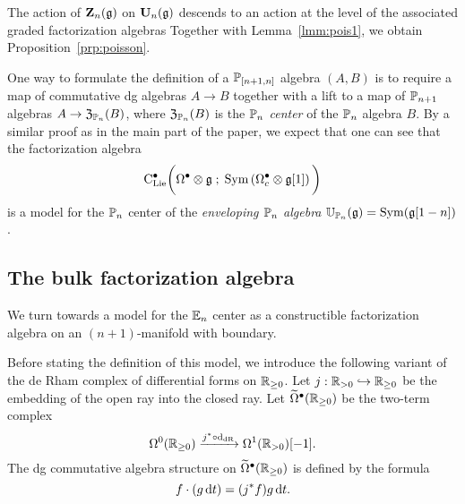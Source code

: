 \documentclass[11pt]{amsart}
\numberwithin{equation}{section}
\begin{document}
The action of $\mathbf Z_n(\mathfrak g)$ on $\mathbf U_n(\mathfrak g)$ descends to an action at the level of the associated graded factorization algebras
Together with Lemma~\ref{lmm:pois1}, we obtain Proposition~\ref{prp:poisson}. 

\begin{rmk}
One way to formulate the definition of a $\mathbb P_{[n+1,n]}$ algebra $(A,B)$ is to require a map of commutative dg algebras $A \to B$ together with a lift to a map of $\mathbb P_{n+1}$ algebras $A \to \mathfrak Z_{\mathbb P_n} (B)$, where $\mathfrak Z_{\mathbb P_n}(B)$ is the {\em $\mathbb P_n$ center} of the $\mathbb P_n$ algebra $B$. 
By a similar proof as in the main part of the paper, we expect that one can see that the factorization algebra
\[
{\rm C}_{\rm Lie}^\bullet \bigg(\Omega^\bullet \otimes \mathfrak g \; ; \; {\rm Sym} \left(\Omega^\bullet_c \otimes \mathfrak g [1] \right) \bigg)
\]
is a model for the $\mathbb P_n$ center of the {\em enveloping $\mathbb P_n$ algebra} $\mathbb U_{\mathbb P_n} (\mathfrak g) = {\rm Sym} (\mathfrak g [1-n])$. 
\end{rmk}

\subsection{The bulk factorization algebra} \label{sec:bulk}

We turn towards a model for the $\mathbb E_n$ center as a constructible factorization algebra on an $(n+1)$-manifold with boundary.

Before stating the definition of this model, we introduce the following variant of the de Rham complex of differential forms on $\mathbb R_{\geq 0}$. 
Let $j : \mathbb R_{>0} \hookrightarrow \mathbb R_{\geq 0}$ be the embedding of the open ray into the closed ray. 
Let $\widetilde{\Omega}^\bullet (\mathbb R_{\geq 0})$ be the two-term complex
\[
\Omega^0(\mathbb R_{\geq 0}) \xrightarrow{j^* \circ {\rm d}_{\rm dR}} \Omega^1(\mathbb R_{>0})[-1]  .
\]
The dg commutative algebra structure on $\widetilde{\Omega}^\bullet (\mathbb R_{\geq 0})$ is defined by the formula
\[
f \cdot (g \, {\rm d} t) = (j^* f) g\, {\rm d} t .
\]
\end{document}
